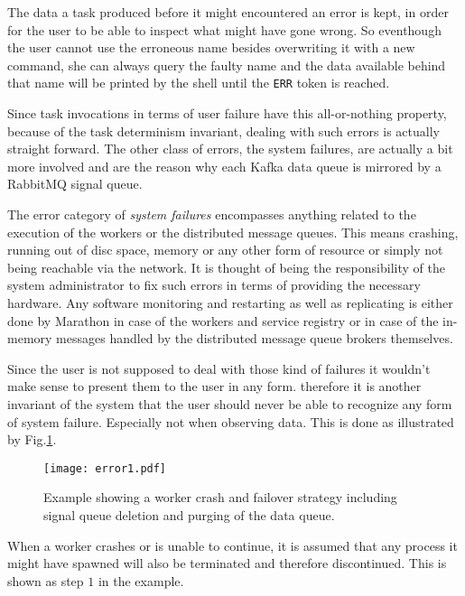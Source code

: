 The data a task produced before it might encountered an error is
kept, in order for the user to be able to inspect what might have
gone wrong. So eventhough the user cannot use the erroneous name
besides overwriting it with a new command, she can always
query the faulty name and the data available behind that name will
be printed by the shell until the \texttt{ERR} token is reached.

Since task invocations in terms of user failure have this
all-or-nothing property, because of the task determinism invariant,
dealing with such errors is actually straight forward.
The other class of errors, the system failures, are actually a bit more
involved and are the reason why each Kafka data queue is mirrored
by a RabbitMQ signal queue.
\newline

The error category of \textit{system failures} encompasses anything
related to the execution of the workers or the distributed message
queues. This means crashing, running out of disc space, memory or
any other form of resource or simply not being reachable via the network.
It is thought of being the responsibility of the system administrator
to fix such errors in terms of providing the necessary hardware.
Any software monitoring and restarting as well as replicating is either
done by Marathon in case of the workers and service registry or in
case of the in-memory messages handled by the distributed message
queue brokers themselves.

Since the user is not supposed to deal with those kind of failures
it wouldn't make sense to present them to the user in any form.
therefore it is another invariant of the system that the user should
never be able to recognize any form of system failure. Especially
not when observing data.
This is done as illustrated by Fig.\ref{error1}.

\begin{figure}[h]
  \texttt{[image: error1.pdf]}
  \caption{Example showing a worker crash and failover strategy
           including signal queue deletion and purging of the
           data queue.}
  \label{error1}
\end{figure}

When a worker crashes or is unable to
continue, it is assumed that any process it might have spawned
will also be terminated and therefore discontinued. This is shown
as step $1$ in the example.


